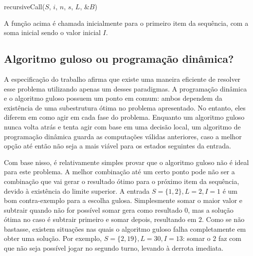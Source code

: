 \documentclass[10pt,a4paper]{article}
\numberwithin{equation}{section}
\begin{document}
\begin{function}[H]
    \caption{recursiveCall($S$, $i$, $n$, $s$, $L$, \&$B$)}

    \BlankLine


\end{function}

A função acima é chamada inicialmente para o primeiro item da sequência, com a soma inicial sendo o valor inicial $I$.

\subsection{Algoritmo guloso ou programação dinâmica?}

A especificação do trabalho afirma que existe uma maneira eficiente de resolver esse problema utilizando apenas um desses paradigmas. A programação dinâmica e o algoritmo guloso possuem um ponto em comum: ambos dependem da existência de uma subestrutura ótima no problema apresentado. No entanto, eles diferem em como agir em cada fase do problema. Enquanto um algoritmo guloso nunca volta atrás e tenta agir com base em uma decisão local, um algoritmo de programação dinâmica guarda as computações válidas anteriores, caso a melhor opção até então não seja a mais viável para os estados seguintes da entrada.

Com base nisso, é relativamente simples provar que o algoritmo guloso não é ideal para este problema. A melhor combinação até um certo ponto pode não ser a combinação que vai gerar o resultado ótimo para o próximo item da sequência, devido à existência do limite superior. A entrada $S = \{1,2\}, L = 2, I = 1$ é um bom contra-exemplo para a escolha gulosa. Simplesmente somar o maior valor e subtrair quando não for possível somar gera como resultado $0$, mas a solução ótima no caso é subtrair primeiro e somar depois, resultando em $2$. Como se não bastasse, existem situações nas quais o algoritmo guloso falha completamente em obter uma solução. Por exemplo, $S = \{2, 19\}, L = 30, I = 13$: somar o $2$ faz com que não seja possível jogar no segundo turno, levando à derrota imediata.
\end{document}
